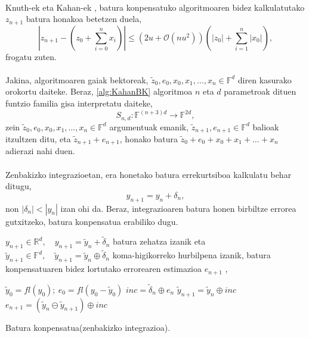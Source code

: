 \paragraph*{}Knuth-ek eta Kahan-ek \cite{Muller2009},  batura konpensatuko algoritmoaren bidez kalkulatutako $z_{n+1}$ batura honakoa betetzen duela, 
\begin{equation*}
\left | z_{n+1} - (z_0+\sum_{i=0}^{n} x_i) \right | \leq (2u+ \mathcal{O}(nu^2)) \left(|z_0|+\sum_{i=1}^{n} |x_0|\right),
\end{equation*}
frogatu zuten.

\paragraph*{} Jakina, algoritmoaren gaiak bektoreak, $\tilde z_0, e_0, x_0, x_1, \dots, x_n \in \mathbb{F}^d$ diren kasurako orokortu daiteke. Beraz, \ref{alg:KahanBK} algoritmoa $n$ eta $d$ parametroak dituen funtzio familia gisa interpretatu daiteke,
\begin{equation*}
S_{n,d} : \mathbb{F}^{(n+3)d} \rightarrow \mathbb{F}^{2d},
\end{equation*}
zein $\tilde z_0, e_0, x_0, x_1, \dots, x_n \in \mathbb{F}^d$ argumentuak emanik, $\tilde z_{n+1}, e_{n+1} \in \mathbb{F}^d$ balioak itzultzen ditu, eta $\tilde z_{n+1}+e_{n+1}$, honako batura $\tilde z_0+e_0+x_0+x_1+ \dots+x_n$ adierazi nahi duen.
 

\paragraph*{} Zenbakizko integrazioetan, era honetako batura errekurtsiboa kalkulatu behar ditugu,
\begin{equation*}
y_{n+1}=y_n+\delta_n,
\end{equation*}  
non $|\delta_n|<|y_n|$ izan ohi da. Beraz, integrazioaren batura honen birbiltze errorea gutxitzeko, batura konpensatua erabiliko dugu.  

$y_{n+1} \in \mathbb{R}^{d},\quad y_{n+1}=\tilde y_{n}+\tilde \delta_n$ batura zehatza izanik eta $\tilde y_{n+1} \in \mathbb{F}^{d}, \quad \tilde y_{n+1}=\tilde y_{n} \oplus \tilde \delta_n$ koma-higikorreko hurbilpena izanik, batura konpensatuaren bidez lortutako errorearen estimazioa $e_{n+1}$ ,

\begin{algorithm}[H]
 \BlankLine
  $\tilde{y}_{0}=fl(y_{0}); \ e_0=fl(y_0-\tilde{y}_0)$\;
 \BlankLine
  {
   \BlankLine
    $inc=\tilde {\delta}_n \oplus e_n$\;
    $\tilde {y}_{n+1}=\tilde{y}_n \oplus inc$\;
    $e_{n+1}=(\tilde{y}_n \ominus \tilde {y}_{n+1}) \oplus inc$\;
   \BlankLine
  }
 \caption{Batura konpensatua(zenbakizko integrazioa).}
\end{algorithm}

